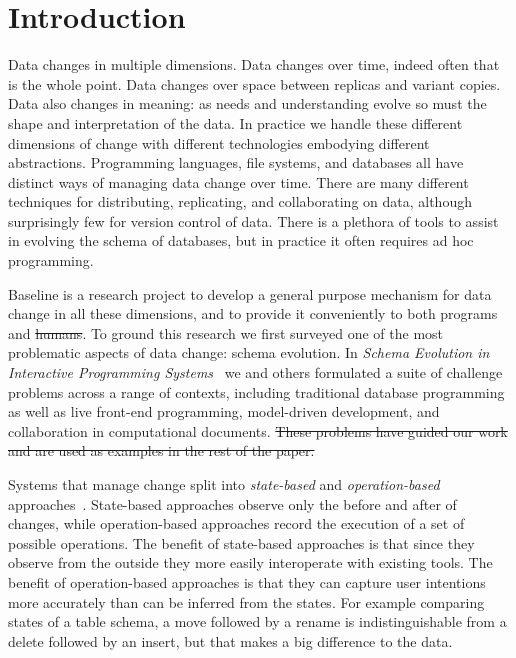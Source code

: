 \documentclass[english,submission]{programming}
\theoremstyle{definition}
\providecommand{\DIFadd}[1]{{\protect\color{blue}\uwave{#1}}} %
\providecommand{\DIFdel}[1]{{\protect\color{red}\sout{#1}}} %
\providecommand{\DIFaddbegin}{} %
\providecommand{\DIFaddend}{} %
\providecommand{\DIFdelbegin}{} %
\providecommand{\DIFdelend}{} %
\begin{document}
\section{Introduction}

Data changes in multiple dimensions. Data changes over time, indeed often that is the whole point. Data changes over space between replicas and variant copies. Data also changes in meaning: as needs and understanding evolve so must the shape and interpretation of the data. In practice we handle these different dimensions of change with different technologies embodying different abstractions. Programming languages, file systems, and databases all have distinct ways of managing data change over time. There are many different techniques for distributing, replicating, and collaborating on data, although surprisingly few for version control of data. There is a plethora of tools to assist in evolving the schema of databases, but in practice it often requires ad hoc programming.

Baseline is a research project to develop a general purpose mechanism for data change in all these dimensions, and to provide it conveniently to both programs and \DIFdelbegin \DIFdel{humans}\DIFdelend \DIFaddbegin \DIFadd{users}\DIFaddend .
To ground this research we first surveyed one of the most problematic aspects of data change: schema evolution. In \textit{Schema Evolution in Interactive Programming Systems}~\cite{challenge-problems} we and others formulated a suite of challenge problems across a range of contexts, including traditional database programming as well as live front-end programming, model-driven development, and collaboration in computational documents.
\DIFdelbegin \DIFdel{These problems have guided our work and are used as examples in the rest of the paper.
}\DIFdelend %

Systems that manage change split into \textit{state-based} and \textit{operation-based} approaches~\cite{diff3, Shapiro11}. State-based approaches observe only the before and after of changes, while operation-based approaches record the execution of a set of possible operations.
The benefit of state-based approaches is that since they observe from the outside they more easily interoperate with existing tools.
The benefit of operation-based approaches is that they can capture user intentions more accurately than can be inferred from the states. For example comparing states of a table schema, a move followed by a rename is indistinguishable from a delete followed by an insert, but that makes a big difference to the data.
\end{document}
